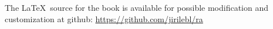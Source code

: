 \documentclass[12pt]{book}
\theoremstyle{plain}
\theoremstyle{remark}
\theoremstyle{definition}
\theoremstyle{exercise}
\theoremstyle{example}
\begin{document}
\bigskip

\noindent
The \LaTeX\ source for the book is available
for possible modification and customization
at github: \url{https://github.com/jirilebl/ra}



\tableofcontents
{}

\newpage




\newcommand{\VolOneIntroExtrahead}{
\subsection{About Volume I}
}

\newcommand{\VolTwoIntro}{
\subsection{About Volume II}


}



















\end{document}
